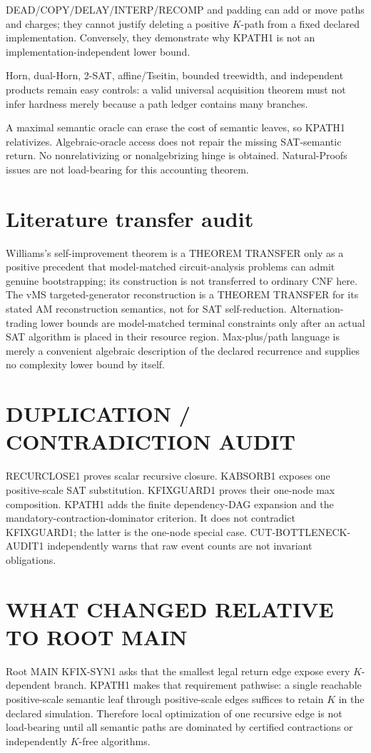 \documentclass[11pt]{article}
\begin{document}
DEAD/COPY/DELAY/INTERP/RECOMP and padding can add or move paths and charges; they cannot justify deleting a positive \(K\)-path from a fixed declared implementation. Conversely, they demonstrate why KPATH1 is not an implementation-independent lower bound.

Horn, dual-Horn, 2-SAT, affine/Tseitin, bounded treewidth, and independent products remain easy controls: a valid universal acquisition theorem must not infer hardness merely because a path ledger contains many branches.

A maximal semantic oracle can erase the cost of semantic leaves, so KPATH1 relativizes. Algebraic-oracle access does not repair the missing SAT-semantic return. No nonrelativizing or nonalgebrizing hinge is obtained. Natural-Proofs issues are not load-bearing for this accounting theorem.

\section*{Literature transfer audit}
Williams's self-improvement theorem is a THEOREM TRANSFER only as a positive precedent that model-matched circuit-analysis problems can admit genuine bootstrapping; its construction is not transferred to ordinary CNF here. The vMS targeted-generator reconstruction is a THEOREM TRANSFER for its stated AM reconstruction semantics, not for SAT self-reduction. Alternation-trading lower bounds are model-matched terminal constraints only after an actual SAT algorithm is placed in their resource region. Max-plus/path language is merely a convenient algebraic description of the declared recurrence and supplies no complexity lower bound by itself.

\section*{DUPLICATION / CONTRADICTION AUDIT}
RECURCLOSE1 proves scalar recursive closure. KABSORB1 exposes one positive-scale SAT substitution. KFIXGUARD1 proves their one-node max composition. KPATH1 adds the finite dependency-DAG expansion and the mandatory-contraction-dominator criterion. It does not contradict KFIXGUARD1; the latter is the one-node special case. CUT-BOTTLENECK-AUDIT1 independently warns that raw event counts are not invariant obligations.

\section*{WHAT CHANGED RELATIVE TO ROOT MAIN}
Root MAIN KFIX-SYN1 asks that the smallest legal return edge expose every \(K\)-dependent branch. KPATH1 makes that requirement pathwise: a single reachable positive-scale semantic leaf through positive-scale edges suffices to retain \(K\) in the declared simulation. Therefore local optimization of one recursive edge is not load-bearing until all semantic paths are dominated by certified contractions or independently \(K\)-free algorithms.
\end{document}
